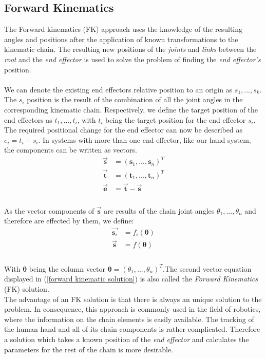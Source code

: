 \subsection{Forward Kinematics}
  \label{sec:Forward Kinematics} 
The Forward kinematics (FK) approach uses the knowledge of the resulting angles and positions after the application of known transformations to the kinematic chain. The resulting new positions of the \textit{joints} and \textit{links} between the \textit{root} and the \textit{end effector} is used to solve the problem of finding the \textit{end effector's} position.\\\\
We can denote the existing end effectors relative position to an origin as $ s_{1},...,s_{k}$. The $s_{i}$ position is the result of the combination of all the joint angles in the corresponding kinematic chain. Respectively, we define the target position of the end effectors as $t_{1},...,t_{i}$, with $t_{i}$ being the target position for the end effector $s_{i}$. The required positional change for the end effector can now be described as $e_{i}=t_{i}-s_{i}$. In systems with more than one end effector, like our hand system, the components can be written as vectors.\\
\begin{equation}
\label{fk components}
\begin{split}
\vec{\textbf{s}}&=(\textbf{s}_{1},...,\textbf{s}_{n})^{T}\\
\vec{\textbf{t}}&=(\textbf{t}_{1},...,\textbf{t}_{n})^{T}\\
\vec{\textbf{e}}&= \vec{\textbf{t}}-\vec{\textbf{s}}\\
\end{split}
\end{equation}
\\As the vector components of $\vec{\textbf{s}}$ are results of the chain joint angles $\theta_{1},...,\theta_{n}$ and therefore are effected by them, we define: \\
\begin{equation}
\label{forward kinematic solution}
\begin{split}
\vec{\textbf{s}_{i}}&=f_{i}(\pmb{\theta})\\
\vec{\textbf{s}}&=f(\pmb{\theta})\\
\end{split}
\end{equation}
\\With $\pmb{\theta}$ being the column vector $\pmb{\theta}=(\theta_{1},...,\theta_{n})^{T}$.The second vector equation displayed in (\ref{forward kinematic solution}) is also called the \textit{Forward Kinematics} (FK) solution.\\
The advantage of an FK solution is that there is always an unique solution to the problem. In consequence, this approach is commonly used in the field of robotics, where the information on the chain elements is easily available.
The tracking of the human hand and all of its chain components is rather complicated. Therefore a solution which takes a known position of the \textit{end effector} and calculates the parameters for the rest of the chain is more desirable.
